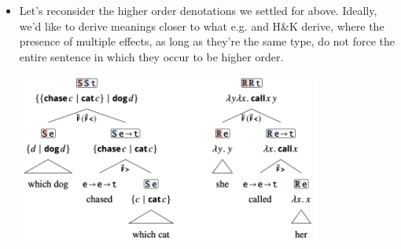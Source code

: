 \documentclass{article}
\begin{document}
\begin{itemize}
  \item Let's reconsider the higher order denotations we settled for above. Ideally, we'd like to derive meanings closer to what
    e.g. \cite{Hamblin1976} and H\&K derive, where the presence of multiple effects, as long as they're the same type, do not force
    the entire sentence in which they occur to be higher order. 
  \begin{exe}
    \ex \label{22} \hfill
      \begin{center}
        \includegraphics[width=10cm]{clips/22.png}
      \end{center}
  \end{exe}
\end{itemize}
\end{document}
